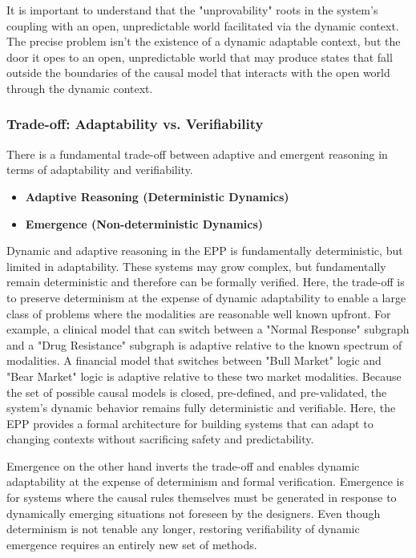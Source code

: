 It is important to understand that the "unprovability" roots in the system's coupling with an open, unpredictable world facilitated via the dynamic context. The precise problem isn't the existence of a dynamic adaptable context, but the door it opes to an open, unpredictable world that may produce states that fall outside the boundaries of the causal model that interacts with the open world through the dynamic context. 

\subsubsection{Trade-off: Adaptability vs. Verifiability}


There is a fundamental trade-off between adaptive and emergent reasoning in terms of adaptability and verifiability.     


\begin{itemize}
	\item \textbf{Adaptive Reasoning (Deterministic Dynamics)}
	\item \textbf{Emergence (Non-deterministic Dynamics)}
\end{itemize}

Dynamic and adaptive reasoning in the EPP is fundamentally deterministic, but limited in adaptability. These systems may grow complex, but fundamentally remain deterministic and therefore can be formally verified. Here, the trade-off is to preserve determinism at the expense of dynamic adaptability to enable a large class of problems where the modalities are reasonable well known upfront. For example, a clinical model that can switch between a "Normal Response" subgraph and a "Drug Resistance" subgraph is adaptive relative to the known spectrum of modalities. A financial model that switches between "Bull Market" logic and "Bear Market" logic is adaptive relative to these two market modalities. Because the set of possible causal models is closed, pre-defined, and pre-validated, the system's dynamic behavior remains fully deterministic and verifiable. Here, the EPP provides a formal architecture for building systems that can adapt to changing contexts without sacrificing safety and predictability.
 
Emergence on the other hand inverts the trade-off and enables dynamic adaptability at the expense of determinism and formal verification. Emergence is for systems where the causal rules themselves must be generated in response to dynamically emerging situations not foreseen by the designers. Even though determinism is not tenable any longer, restoring verifiability of dynamic emergence requires an entirely new set of methods. 

